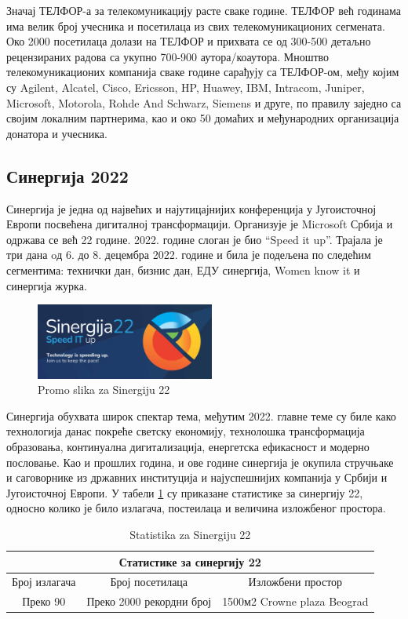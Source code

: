 \documentclass[12pt]{article}
\begin{document}
Значај ТЕЛФОР-а за телекомуникацију расте сваке године. ТЕЛФОР већ годинама има велик број учесника и посетилаца из свих телекомуникационих сегмената. Око 2000 посетилаца долази на ТЕЛФОР и прихвата се од 300-500 детаљно рецензираних радова са укупно 700-900 аутора/коаутора. Мноштво телекомуникационих компанија сваке године сарађују са ТЕЛФОР-ом, међу којим су Agilent, Alcatel, Cisco, Ericsson, HP, Huawey, IBM, Intracom, Juniper, Microsoft, Motorola, Rohde And Schwarz, Siemens и друге, по правилу заједно са својим локалним партнерима, као и око 50 домаћих и међународних организација донатора и учесника.\cite{telfor}

\subsection{Синергија 2022}
Синергија је једна од највећих и најутицајнијих конференција у Југоисточној Европи посвећена дигиталној трансформацији. Организује је Microsoft Србија и одржава се већ 22 године. 2022. године слоган је био “Speed it up”. Трајала је три дана oд 6. до 8. децембра 2022. године и била је подељена по следећим сегментима: технички дан, бизнис дан, ЕДУ синергија, Women know it и синергија журка.

\begin{figure}[h!]
        \centering\includegraphics[height=2.5cm]{slike/sinergija.jpg} 
        \caption{Promo slika za Sinergiju 22}
        \label{fig:sinergija22}
\end{figure}

Синергија обухвата широк спектар тема, међутим 2022. главне теме су биле како технологија данас покреће светску економију, технолошка трансформација образовања, континуална дигитализација, енергетска ефикасност и модерно пословање. Као и прошлих година, и ове године синергија је окупила стручњаке и саговорнике из државних институција и најуспешнијих компанија у Србији и Југоисточној Европи. У табели \ref{tab:tabela1} су приказане статистике за синергију 22, односно колико је било излагача, постеилаца и величина изложбеног простора.\cite{sinergija}

\begin{table}[h!]
\begin{center}
\begin{tabular}{|ccc|} \hline
\multicolumn{3}{|c|}{Статистике за синергију 22}                                                                  \\ \hline
\multicolumn{1}{|c|}{Број излагача} & \multicolumn{1}{c|}{Број посетилаца}          & Изложбени простор           \\ \hline
\multicolumn{1}{|c|}{Преко 90}      & \multicolumn{1}{c|}{Преко 2000 рекордни број} & 1500м2 Crowne plaza Beograd \\ \hline
\end{tabular}
\caption{Statistika za Sinergiju 22}
\label{tab:tabela1}
\end{center}
\end{table}
\end{document}
